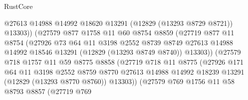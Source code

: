 \begin{lexlean}{RustCore}
\begin{coremodule}
                              @27613
                              @14988
                              @14992
                              @18620
                              @13291
                              (@12829 (@13293 @8729 @8721))
                              @13303))
                          (@27579
                            @877
                            @1758
                            @11
                            @60
                            @8754
                            @8859
                            (@27719
                              @877
                              @11
                              @8754
                              (@27926
                                @73
                                @64
                                @11
                                @3198
                                @2552
                                @8739
                                @8749
                                @27613
                                @14988
                                @14992
                                @18546
                                @13291
                                (@12829 (@13293 @8749 @8740))
                                @13303))
                            (@27579
                              @718
                              @1757
                              @11
                              @59
                              @8775
                              @8858
                              (@27719
                                @718
                                @11
                                @8775
                                (@27926
                                  @171
                                  @64
                                  @11
                                  @3198
                                  @2552
                                  @8759
                                  @8770
                                  @27613
                                  @14988
                                  @14992
                                  @18239
                                  @13291
                                  (@12829 (@13293 @8770 @8760))
                                  @13303))
                              (@27579
                                @769
                                @1756
                                @11
                                @58
                                @8793
                                @8857
                                (@27719
                                  @769

\end{coremodule}
\end{lexlean}
